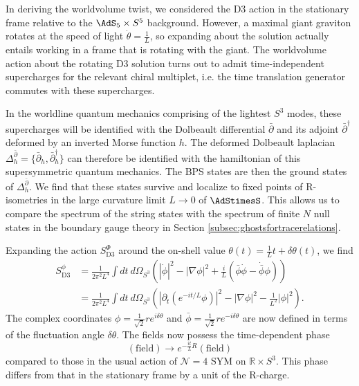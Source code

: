\documentclass[a4paper,12pt]{article}
\begin{document}
In deriving the worldvolume twist, we considered the D3 action in the stationary frame relative to the $\AdS_5 \times S^5$ background. However, a maximal giant graviton rotates at the speed of light $\dot\theta = \frac{1}{L}$, so expanding about the solution actually entails working in a frame that is rotating with the giant. The worldvolume action about the rotating D3 solution turns out to admit time-independent supercharges for the relevant chiral multiplet, i.e. the time translation generator commutes with these supercharges.

In the worldline quantum mechanics comprising of the lightest $S^3$ modes, these supercharges will be identified with the Dolbeault differential $\bar\partial$ and its adjoint $\bar\partial^\dagger$ deformed by an inverted Morse function $h$. The deformed Dolbeault laplacian $\Delta_h^{\bar\partial} = \{ \bar\partial_h, \bar\partial_h^\dagger \}$ can therefore be identified with the hamiltonian of this supersymmetric quantum mechanics. The BPS states are then the ground states of $\Delta_h^{\bar\partial}$. We find that these states survive and localize to fixed points of R-isometries in the large curvature limit $L \to 0$ of $\AdStimesS$. This allows us to compare the spectrum of the string states with the spectrum of finite $N$ null states in the boundary gauge theory in Section \ref{subsec:ghostsfortracerelations}.

Expanding the action $S_{\mathrm{D3}}^{\Phi}$ around the on-shell value $\theta(t) = \frac{1}{L} t + \delta \theta(t)$, we find
\begin{align}
    S_{\mathrm{D3}}^{\phi} &= \frac{1}{2 \pi^2 L^4} \int dt \ d\Omega_{S^3} \left( |\dot{\phi}|^2 - |\nabla\phi|^2 + \frac{i}{L} ( \bar{\phi} \dot{\phi} - \dot{\bar{\phi}} \phi ) \right) \nonumber \\
    &= \frac{1}{2 \pi^2 L^4} \int dt \ d\Omega_{S^3} \left( |\partial_t ( e^{-i t/L} \phi )|^2 - |\nabla\phi|^2 - \frac{1}{ L^2} |\phi|^2 \right).
\end{align}
The complex coordinates $\phi = \frac{1}{\sqrt{2}} r e^{i \delta\theta}$ and $\bar{\phi} = \frac{1}{\sqrt{2}} r e^{-i \delta\theta}$ are now defined in terms of the fluctuation angle $\delta\theta$. The fields now possess the time-dependent phase
\begin{equation}
(\mathrm{field}) \to e^{-\frac{i t}{L} R} (\mathrm{field})
\end{equation}
compared to those in the usual action of $\mathcal{N}=4$ SYM on $\mathbb{R} \times S^3$. This phase differs from that in the stationary frame by a unit of the R-charge.
\end{document}
